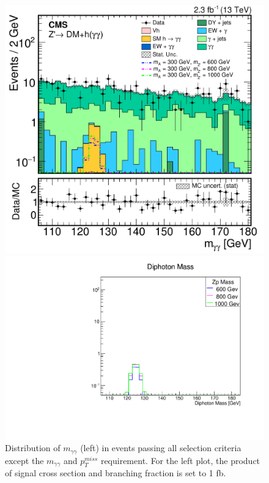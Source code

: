 \documentclass[12pt,A4paper]{article}
\begin{document}
\begin{figure}[h!]
\centering
\begin{minipage}{.5\textwidth}
  \centering
  \includegraphics[scale=0.08]{img/CMS-EXO-16-012_Figure_007-a.png}
\end{minipage}%
\begin{minipage}{.5\textwidth}
  \centering
   \includegraphics[scale=0.45]{img/MZp_M.pdf}
\end{minipage}
\caption{Distribution of $m_{\gamma\gamma}$ (left)\cite{ref:paper} in events passing all selection criteria except the $m_{\gamma\gamma}$ and $p_T^{miss}$ requirement. For the left plot, the product of signal cross section and branching fraction is set to 1 fb.}
\end{figure}
\end{document}
